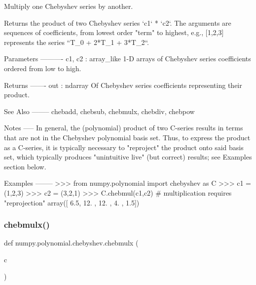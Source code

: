 \begin{DoxyVerb}Multiply one Chebyshev series by another.

Returns the product of two Chebyshev series `c1` * `c2`.  The arguments
are sequences of coefficients, from lowest order "term" to highest,
e.g., [1,2,3] represents the series ``T_0 + 2*T_1 + 3*T_2``.

Parameters
----------
c1, c2 : array_like
    1-D arrays of Chebyshev series coefficients ordered from low to
    high.

Returns
-------
out : ndarray
    Of Chebyshev series coefficients representing their product.

See Also
--------
chebadd, chebsub, chebmulx, chebdiv, chebpow

Notes
-----
In general, the (polynomial) product of two C-series results in terms
that are not in the Chebyshev polynomial basis set.  Thus, to express
the product as a C-series, it is typically necessary to "reproject"
the product onto said basis set, which typically produces
"unintuitive live" (but correct) results; see Examples section below.

Examples
--------
>>> from numpy.polynomial import chebyshev as C
>>> c1 = (1,2,3)
>>> c2 = (3,2,1)
>>> C.chebmul(c1,c2) # multiplication requires "reprojection"
array([  6.5,  12. ,  12. ,   4. ,   1.5])\end{DoxyVerb}
 \mbox{\label{namespacenumpy_1_1polynomial_1_1chebyshev_a8d453d12c44374a7a98a3bd61f59c9af}} 
\subsubsection{\texorpdfstring{chebmulx()}{chebmulx()}}
{\footnotesize\ttfamily def numpy.\+polynomial.\+chebyshev.\+chebmulx (\begin{DoxyParamCaption}\item[{}]{c }\end{DoxyParamCaption})}

